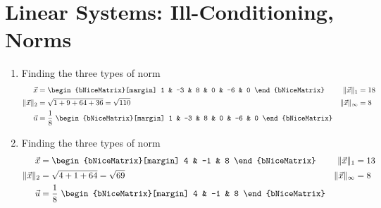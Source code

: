 \section{Linear Systems: Ill-Conditioning, Norms}

\begin{enumerate}
    \item Finding the three types of norm
          \begin{align}
              \vec{x}                      & = \begin{bNiceMatrix}[margin]
                                                   1 & -3 & 8 & 0 & -6 & 0
                                               \end{bNiceMatrix}         &
              \lVert \vec{x} \rVert_1      & = 18                                    \\
              \lVert \vec{x} \rVert_2      & = \sqrt{1 + 9 + 64 + 36} = \sqrt{110} &
              \lVert \vec{x} \rVert_\infty & = 8                                     \\
              \vec{u}                      & = \frac{1}{8}
              \ \begin{bNiceMatrix}[margin]
                    1 & -3 & 8 & 0 & -6 & 0
                \end{bNiceMatrix}
          \end{align}

    \item Finding the three types of norm
          \begin{align}
              \vec{x}                      & = \begin{bNiceMatrix}[margin]
                                                   4 & -1 & 8
                                               \end{bNiceMatrix}   &
              \lVert \vec{x} \rVert_1      & = 13                              \\
              \lVert \vec{x} \rVert_2      & = \sqrt{4 + 1 + 64} = \sqrt{69} &
              \lVert \vec{x} \rVert_\infty & = 8                               \\
              \vec{u}                      & = \frac{1}{8}
              \ \begin{bNiceMatrix}[margin]
                    4 & -1 & 8
                \end{bNiceMatrix}
          \end{align}


\end{enumerate}
